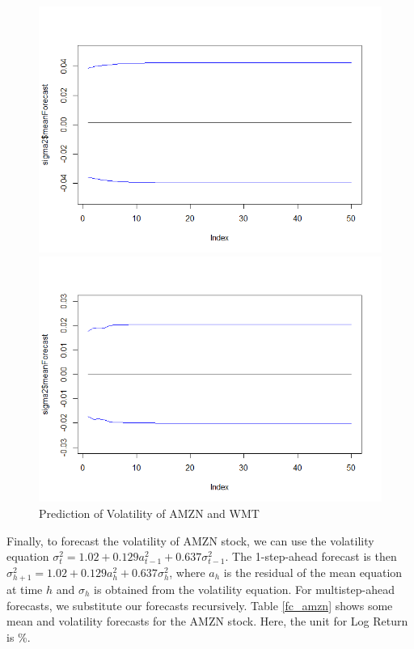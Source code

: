 \documentclass[paper=a4, fontsize=11pt]{article}
\begin{document}
\begin{figure}[!htbp]
\begin{minipage}[!htbp]{0.5\linewidth}
\centering
\includegraphics[scale = 0.45]{img/predict_AMZN}
\end{minipage}
\begin{minipage}[!htbp]{0.5\linewidth}
\centering
\includegraphics[scale = 0.45]{img/predict_WMT}
\end{minipage}
\caption{Prediction of Volatility of AMZN and WMT}
\label{predict}
\end{figure}
\newpage

Finally, to forecast the volatility of AMZN stock, we can use the volatility equation $\sigma_t^2 = 1.02+0.129a_{t-1}^2+0.637\sigma_{t-1}^2$. The 1-step-ahead forecast is then $\sigma_{h+1}^2 = 1.02+0.129a_h^2+0.637\sigma_h^2$, where $a_h$ is the residual of the mean equation at time $h$ and $\sigma_h$ is obtained from the volatility equation. For multistep-ahead forecasts, we substitute our forecasts recursively. Table \ref{fc_amzn} shows some mean and volatility forecasts for the AMZN stock. Here, the unit for Log Return is \%.
\end{document}
